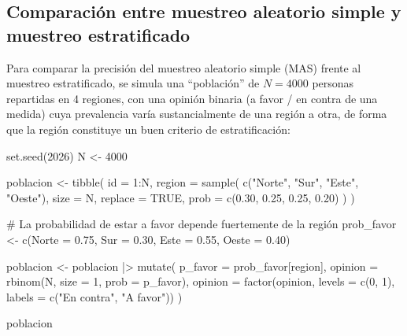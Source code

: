 \documentclass[
  spanish,
  a4paper,
]{scrreport}
\newenvironment{Shaded}{\begin{snugshade}}{\end{snugshade}}
\newcommand{\AttributeTok}[1]{\textcolor[rgb]{0.40,0.45,0.13}{#1}}
\newcommand{\CommentTok}[1]{\textcolor[rgb]{0.37,0.37,0.37}{#1}}
\newcommand{\ConstantTok}[1]{\textcolor[rgb]{0.56,0.35,0.01}{#1}}
\newcommand{\DecValTok}[1]{\textcolor[rgb]{0.68,0.00,0.00}{#1}}
\newcommand{\FloatTok}[1]{\textcolor[rgb]{0.68,0.00,0.00}{#1}}
\newcommand{\FunctionTok}[1]{\textcolor[rgb]{0.28,0.35,0.67}{#1}}
\newcommand{\NormalTok}[1]{\textcolor[rgb]{0.00,0.23,0.31}{#1}}
\newcommand{\OtherTok}[1]{\textcolor[rgb]{0.00,0.23,0.31}{#1}}
\newcommand{\SpecialCharTok}[1]{\textcolor[rgb]{0.37,0.37,0.37}{#1}}
\newcommand{\StringTok}[1]{\textcolor[rgb]{0.13,0.47,0.30}{#1}}
\theoremstyle{definition}
\theoremstyle{definition}
\theoremstyle{remark}
\begin{document}
\subsection{Comparación entre muestreo aleatorio simple y muestreo
estratificado}\label{comparaciuxf3n-entre-muestreo-aleatorio-simple-y-muestreo-estratificado}

Para comparar la precisión del muestreo aleatorio simple (MAS) frente al
muestreo estratificado, se simula una ``población'' de \(N=4000\)
personas repartidas en 4 regiones, con una opinión binaria (a favor / en
contra de una medida) cuya prevalencia varía sustancialmente de una
región a otra, de forma que la región constituye un buen criterio de
estratificación:

\begin{Shaded}
\begin{Highlighting}[]
\FunctionTok{set.seed}\NormalTok{(}\DecValTok{2026}\NormalTok{)}
\NormalTok{N }\OtherTok{\textless{}{-}} \DecValTok{4000}

\NormalTok{poblacion }\OtherTok{\textless{}{-}} \FunctionTok{tibble}\NormalTok{(}
  \AttributeTok{id =} \DecValTok{1}\SpecialCharTok{:}\NormalTok{N,}
  \AttributeTok{region =} \FunctionTok{sample}\NormalTok{(}
    \FunctionTok{c}\NormalTok{(}\StringTok{"Norte"}\NormalTok{, }\StringTok{"Sur"}\NormalTok{, }\StringTok{"Este"}\NormalTok{, }\StringTok{"Oeste"}\NormalTok{),}
    \AttributeTok{size =}\NormalTok{ N,}
    \AttributeTok{replace =} \ConstantTok{TRUE}\NormalTok{,}
    \AttributeTok{prob =} \FunctionTok{c}\NormalTok{(}\FloatTok{0.30}\NormalTok{, }\FloatTok{0.25}\NormalTok{, }\FloatTok{0.25}\NormalTok{, }\FloatTok{0.20}\NormalTok{)}
\NormalTok{  )}
\NormalTok{)}

\CommentTok{\# La probabilidad de estar a favor depende fuertemente de la región}
\NormalTok{prob\_favor }\OtherTok{\textless{}{-}} \FunctionTok{c}\NormalTok{(}\AttributeTok{Norte =} \FloatTok{0.75}\NormalTok{, }\AttributeTok{Sur =} \FloatTok{0.30}\NormalTok{, }\AttributeTok{Este =} \FloatTok{0.55}\NormalTok{, }\AttributeTok{Oeste =} \FloatTok{0.40}\NormalTok{)}

\NormalTok{poblacion }\OtherTok{\textless{}{-}}\NormalTok{ poblacion }\SpecialCharTok{|\textgreater{}}
  \FunctionTok{mutate}\NormalTok{(}
    \AttributeTok{p\_favor =}\NormalTok{ prob\_favor[region],}
    \AttributeTok{opinion =} \FunctionTok{rbinom}\NormalTok{(N, }\AttributeTok{size =} \DecValTok{1}\NormalTok{, }\AttributeTok{prob =}\NormalTok{ p\_favor),}
    \AttributeTok{opinion =} \FunctionTok{factor}\NormalTok{(opinion, }\AttributeTok{levels =} \FunctionTok{c}\NormalTok{(}\DecValTok{0}\NormalTok{, }\DecValTok{1}\NormalTok{), }\AttributeTok{labels =} \FunctionTok{c}\NormalTok{(}\StringTok{"En contra"}\NormalTok{, }\StringTok{"A favor"}\NormalTok{))}
\NormalTok{  )}

\NormalTok{poblacion}
\end{Highlighting}
\end{Shaded}
\end{document}
